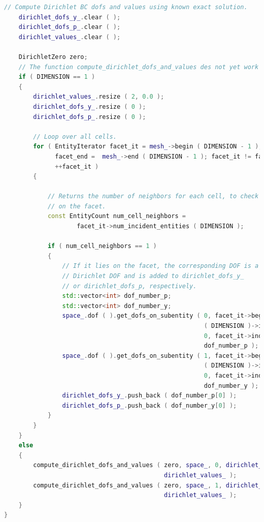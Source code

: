 \documentclass[a4paper, 11pt, twoside]{article}
\begin{document}
\begin{lstlisting}[language=C++, basicstyle={\footnotesize, \ttfamily}, keywordstyle=\color{blue}, numbers=none, tabsize=4]
    // Compute Dirichlet BC dofs and values using known exact solution.
    dirichlet_dofs_y_.clear ( );
    dirichlet_dofs_p_.clear ( );
    dirichlet_values_.clear ( );

    DirichletZero zero;
    // The function compute_dirichlet_dofs_and_values des not yet work for 1D.
    if ( DIMENSION == 1 )
    {
        dirichlet_values_.resize ( 2, 0.0 );
        dirichlet_dofs_y_.resize ( 0 );
        dirichlet_dofs_p_.resize ( 0 );

        // Loop over all cells.
        for ( EntityIterator facet_it = mesh_->begin ( DIMENSION - 1 ), 
              facet_end =  mesh_->end ( DIMENSION - 1 ); facet_it != facet_end; 
              ++facet_it )
        {

            // Returns the number of neighbors for each cell, to check if it is
            // on the facet.
            const EntityCount num_cell_neighbors =
                    facet_it->num_incident_entities ( DIMENSION );

            if ( num_cell_neighbors == 1 )
            {
                // If it lies on the facet, the corresponding DOF is a
                // Dirichlet DOF and is added to dirichlet_dofs_y_ 
                // or dirichlet_dofs_p, respectively.
                std::vector<int> dof_number_p;
                std::vector<int> dof_number_y;
                space_.dof ( ).get_dofs_on_subentity ( 0, facet_it->begin_incident
                                                       ( DIMENSION )->index ( ), 
                                                       0, facet_it->index ( ), 
                                                       dof_number_p );
                space_.dof ( ).get_dofs_on_subentity ( 1, facet_it->begin_incident
                                                       ( DIMENSION )->index ( ), 
                                                       0, facet_it->index ( ), 
                                                       dof_number_y );
                dirichlet_dofs_y_.push_back ( dof_number_p[0] );
                dirichlet_dofs_p_.push_back ( dof_number_y[0] );
            }
        }
    }
    else
    {
        compute_dirichlet_dofs_and_values ( zero, space_, 0, dirichlet_dofs_p_,
                                            dirichlet_values_ );
        compute_dirichlet_dofs_and_values ( zero, space_, 1, dirichlet_dofs_y_,
                                            dirichlet_values_ );
    }
}
\end{lstlisting}
\end{document}
